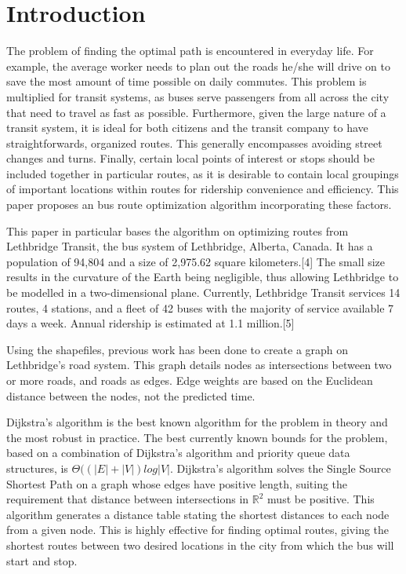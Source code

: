 \documentclass[letter,10pt]{article}
\begin{document}
\newpage
\section{Introduction}
\onehalfspacing
The problem of finding the optimal path is encountered in everyday life. For example, the average worker needs to plan out the roads he/she will drive on to save the most amount of time possible on daily commutes. This problem is multiplied for transit systems, as buses serve passengers from all across the city that need to travel as fast as possible. Furthermore, given the large nature of a transit system, it is ideal for both citizens and the transit company to have straightforwards, organized routes. This generally encompasses avoiding street changes and turns. Finally, certain local points of interest or stops should be included together in particular routes, as it is desirable to contain local groupings of important locations within routes for ridership convenience and efficiency. This paper proposes an bus route optimization algorithm incorporating these factors.

This paper in particular bases the algorithm on optimizing routes from Lethbridge Transit, the bus system of Lethbridge, Alberta, Canada. It has a population of 94,804 and a size of 2,975.62 square kilometers.[4] The small size results in the curvature of the Earth being negligible, thus allowing Lethbridge to be modelled in a two-dimensional plane. Currently, Lethbridge Transit services 14 routes, 4 stations, and a fleet of 42 buses with the majority of service available 7 days a week. Annual ridership is estimated at 1.1 million.[5]

Using the shapefiles, previous work has been done to create a graph on Lethbridge's road system. This graph details nodes as intersections between two or more roads, and roads as edges. Edge weights are based on the Euclidean distance between the nodes, not the predicted time.

Dijkstra's algorithm is the best known algorithm for the problem in theory and the most robust in practice. The best currently known bounds for the problem, based on a combination of Dijkstra's algorithm and priority queue data structures, is $\Theta ((|E|+|V|)log|V|$. Dijkstra's algorithm solves the Single Source Shortest Path on a graph whose edges have positive length, suiting the requirement that distance between intersections in $\mathbb{R}^2$  must be positive. This algorithm generates a distance table stating the shortest distances to each node from a given node. This is highly effective for finding optimal routes, giving the shortest routes between two desired locations in the city from which the bus will start and stop.
\end{document}
